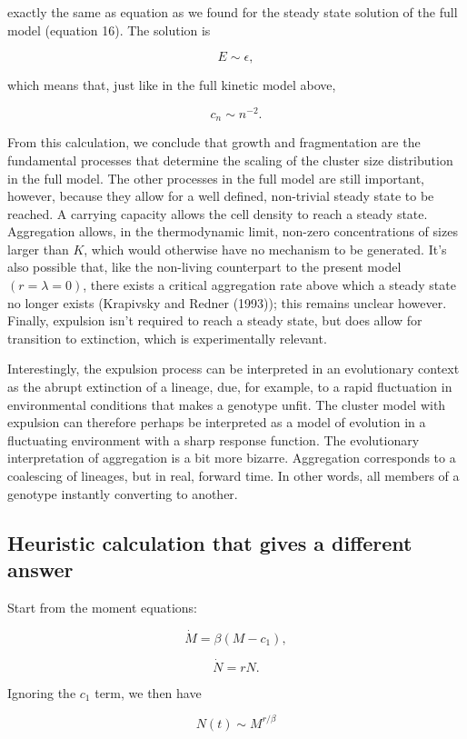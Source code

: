 \documentclass[12pt]{article}
\def\be{\begin{equation}}
\def\ee{\end{equation}}
\begin{document}
\noindent exactly the same as equation as we found for the steady state solution of the full model (equation 16). The solution is

\be
E \sim \epsilon,
\ee

\noindent which means that, just like in the full kinetic model above,

\be
c_n \sim n^{-2}.
\ee

\noindent  From this calculation, we conclude that growth and fragmentation are the fundamental processes that determine the scaling of the cluster size distribution in the full model. The other processes in the full model are still important, however, because they allow for a well defined, non-trivial steady state to be reached. A carrying capacity allows the cell density to reach a steady state. Aggregation allows, in the thermodynamic limit, non-zero concentrations of sizes larger than $K$, which would otherwise have no mechanism to be generated. It's also possible that, like the non-living counterpart to the present model $(r=\lambda=0)$, there exists a critical aggregation rate above which a steady state no longer exists (Krapivsky and Redner (1993)); this remains unclear however. Finally, expulsion isn't required to reach a steady state, but does allow for transition to extinction, which is experimentally relevant.

Interestingly, the expulsion process can be interpreted in an evolutionary context as the abrupt extinction of a lineage, due, for example, to a rapid fluctuation in environmental conditions that makes a genotype unfit. The cluster model with expulsion can therefore perhaps be interpreted as a model of evolution in a fluctuating environment with a sharp response function. The evolutionary interpretation of aggregation is a bit more bizarre. Aggregation corresponds to a coalescing of lineages, but in real, forward time. In other words, all members of a genotype instantly converting to another. 

\subsection*{Heuristic calculation that gives a different answer}
Start from the moment equations:

\be
\dot{M} = \beta(M-c_1),
\ee

\be
\dot{N} = rN.
\ee

Ignoring the $c_1$ term, we then have

\be
N(t) \sim M^{r/\beta}
\ee
\end{document}
